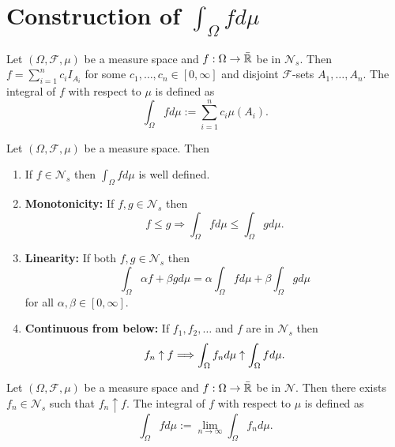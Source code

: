 

\section{Construction of $\int_\Omega f d\mu$}


\begin{definition}
Let $(\Omega, \mathcal F, \mu)$ be a measure space and $f:\Omega\rightarrow \bar{\Bbb R}$ be in $\mathscr N_s$.  Then $f=\sum_{i=1}^n c_i I_{A_i}$ for some $c_1,\ldots, c_n \in[0,\infty]$ and disjoint $\mathcal F$-sets $A_1,\ldots, A_n$. The  integral of $f$ with respect to $\mu$ is defined as
\[ \int_{\Omega} f d\mu:= \sum_{i=1}^n c_i \mu(A_i). \]
\end{definition}


\begin{theorem}
Let $(\Omega, \mathcal F, \mu)$ be a measure space. Then
\begin{enumerate}
\item If $f\in \mathscr N_s$ then $\int_\Omega f d\mu$ is well defined.
\item {\bf Monotonicity:} If $f, g\in \mathscr N_s$ then
\[ \text{$f\leq g$}\Longrightarrow \int_\Omega fd\mu\leq \int_\Omega g d\mu.  \]
\item {\bf Linearity:}
If both $f, g\in \mathscr N_s$ then
\begin{equation}
\label{llin}
\int_\Omega \alpha f + \beta g d\mu =  \alpha \int_\Omega fd\mu + \beta \int_\Omega gd\mu
\end{equation}
for all $ \alpha, \beta\in[0,\infty]$.
\item {\bf Continuous from below:} If $f_1, f_2,\ldots$ and $f$ are in $\mathscr N_s$ then
\[ \text{$ f_n\uparrow f$}\Longrightarrow \int_\Omega f_n d\mu\uparrow \int_\Omega f d\mu.  \]
\end{enumerate}
\end{theorem}




\begin{definition}
Let $(\Omega, \mathcal F, \mu)$ be a measure space and $f:\Omega\rightarrow \bar{\Bbb R}$ be in $\mathscr N$. Then  there exists $f_n\in\mathscr N_s$ such that $f_n\uparrow f$.
The integral of $f$ with respect to $\mu$ is defined as
\[ \int_{\Omega} f d\mu:=\lim_{n\rightarrow \infty} \int_\Omega f_n d\mu. \]
\end{definition}




